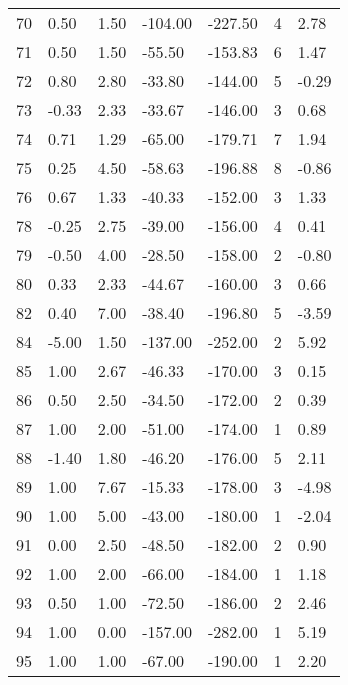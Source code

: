 \begin{appendices}
\begin{longtable}[c]{@{}lllllll@{}}
\rowcolor[HTML]{FFCCC9}
70 & 0.50 & 1.50 & -104.00 & -227.50 & 4 & 2.78 \\
\rowcolor[HTML]{FFCCC9}
71 & 0.50 & 1.50 & -55.50 & -153.83 & 6 & 1.47 \\
\rowcolor[HTML]{FFCCC9}
72 & 0.80 & 2.80 & -33.80 & -144.00 & 5 & -0.29 \\
\rowcolor[HTML]{FFCCC9}
73 & -0.33 & 2.33 & -33.67 & -146.00 & 3 & 0.68 \\
\rowcolor[HTML]{FFCCC9}
74 & 0.71 & 1.29 & -65.00 & -179.71 & 7 & 1.94 \\
\rowcolor[HTML]{FFCCC9}
75 & 0.25 & 4.50 & -58.63 & -196.88 & 8 & -0.86 \\
\rowcolor[HTML]{FFCCC9}
76 & 0.67 & 1.33 & -40.33 & -152.00 & 3 & 1.33 \\
\rowcolor[HTML]{FFCCC9}
78 & -0.25 & 2.75 & -39.00 & -156.00 & 4 & 0.41 \\
\rowcolor[HTML]{FFCCC9}
79 & -0.50 & 4.00 & -28.50 & -158.00 & 2 & -0.80 \\
\rowcolor[HTML]{FFCCC9}
80 & 0.33 & 2.33 & -44.67 & -160.00 & 3 & 0.66 \\
\rowcolor[HTML]{FFCCC9}
82 & 0.40 & 7.00 & -38.40 & -196.80 & 5 & -3.59 \\
\rowcolor[HTML]{FFCCC9}
84 & -5.00 & 1.50 & -137.00 & -252.00 & 2 & 5.92 \\
\rowcolor[HTML]{FFCCC9}
85 & 1.00 & 2.67 & -46.33 & -170.00 & 3 & 0.15 \\
\rowcolor[HTML]{FFCCC9}
86 & 0.50 & 2.50 & -34.50 & -172.00 & 2 & 0.39 \\
\rowcolor[HTML]{FFCCC9}
87 & 1.00 & 2.00 & -51.00 & -174.00 & 1 & 0.89 \\
\rowcolor[HTML]{FFCCC9}
88 & -1.40 & 1.80 & -46.20 & -176.00 & 5 & 2.11 \\
\rowcolor[HTML]{FFCCC9}
89 & 1.00 & 7.67 & -15.33 & -178.00 & 3 & -4.98 \\
\rowcolor[HTML]{FFCCC9}
90 & 1.00 & 5.00 & -43.00 & -180.00 & 1 & -2.04 \\
\rowcolor[HTML]{FFCCC9}
91 & 0.00 & 2.50 & -48.50 & -182.00 & 2 & 0.90 \\
\rowcolor[HTML]{FFCCC9}
92 & 1.00 & 2.00 & -66.00 & -184.00 & 1 & 1.18 \\
\rowcolor[HTML]{FFCCC9}
93 & 0.50 & 1.00 & -72.50 & -186.00 & 2 & 2.46 \\
\rowcolor[HTML]{FFCCC9}
94 & 1.00 & 0.00 & -157.00 & -282.00 & 1 & 5.19 \\
\rowcolor[HTML]{FFCCC9}
95 & 1.00 & 1.00 & -67.00 & -190.00 & 1 & 2.20 \\

\end{longtable}
\end{appendices}
